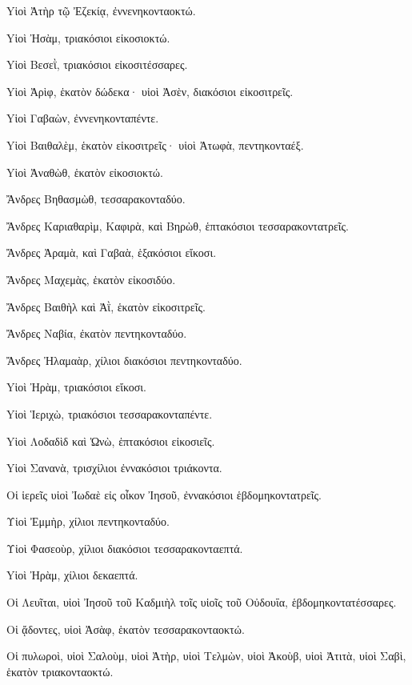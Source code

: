 {\par }{\PP {}Yἱοὶ Ἀτὴρ τῷ Ἐζεκίᾳ, ἐννενηκονταοκτώ.
\par }{\PP {}Yἱοὶ Ἠσὰμ, τριακόσιοι εἰκοσιοκτώ.
\par }{\PP {}Yἱοὶ Βεσεῒ, τριακόσιοι εἰκοσιτέσσαρες.
\par }{\PP {}Yἱοὶ Ἀρὶφ, ἑκατὸν δώδεκα· υἱοὶ Ἀσὲν, διακόσιοι εἰκοσιτρεῖς.
\par }{\PP {}Yἱοὶ Γαβαὼν, ἐννενηκονταπέντε.
\par }{\PP {}Yἱοὶ Βαιθαλὲμ, ἑκατὸν εἰκοσιτρεῖς· υἱοὶ Ἀτωφὰ, πεντηκονταέξ.
\par }{\PP {}Yἱοὶ Ἀναθὼθ, ἑκατὸν εἰκοσιοκτώ.
\par }{\PP {}Ἄνδρες Βηθασμὼθ, τεσσαρακονταδύο.
\par }{\PP {}Ἄνδρες Καριαθαρὶμ, Καφιρὰ, καὶ Βηρὼθ, ἑπτακόσιοι τεσσαρακοντατρεῖς.
\par }{\PP {}Ἄνδρες Ἀραμὰ, καὶ Γαβαὰ, ἑξακόσιοι εἴκοσι.
\par }{\PP {}Ἄνδρες Μαχεμὰς, ἑκατὸν εἰκοσιδύο.
\par }{\PP {}Ἄνδρες Βαιθὴλ καὶ Ἀῒ, ἑκατὸν εἰκοσιτρεῖς.
\par }{\PP {}Ἄνδρες Ναβία, ἐκατὸν πεντηκονταδύο.
\par }{\PP {}Ἄνδρες Ἠλαμαὰρ, χίλιοι διακόσιοι πεντηκονταδύο.
\par }{\PP {}Yἱοὶ Ἠρὰμ, τριακόσιοι εἴκοσι.
\par }{\PP {}Yἱοὶ Ἱεριχὼ, τριακόσιοι τεσσαρακονταπέντε.
\par }{\PP {}Yἱοὶ Λοδαδὶδ καὶ Ὠνὼ, ἑπτακόσιοι εἰκοσιεῖς.
\par }{\PP {}Yἱοὶ Σανανὰ, τρισχίλιοι ἐννακόσιοι τριάκοντα.
\par }{\PP {}Οἱ ἱερεῖς υἱοὶ Ἰωδαὲ εἰς οἶκον Ἰησοῦ, ἐννακόσιοι ἑβδομηκοντατρεῖς.
\par }{\PP {}Υἱοὶ Ἐμμὴρ, χίλιοι πεντηκονταδύο.
\par }{\PP {}Υἱοὶ Φασεοὺρ, χίλιοι διακόσιοι τεσσαρακονταεπτά.
\par }{\PP {}Yἱοὶ Ἠρὰμ, χίλιοι δεκαεπτά.
\par }{\PP {}Οἱ Λευῖται, υἱοὶ Ἰησοῦ τοῦ Καδμιὴλ τοῖς υἱοῖς τοῦ Οὐδουΐα, ἑβδομηκοντατέσσαρες.
\par }{\PP {}Οἱ ᾄδοντες, υἱοὶ Ἀσὰφ, ἑκατὸν τεσσαρακονταοκτώ.
\par }{\PP {}Οἱ πυλωροὶ, υἱοὶ Σαλοὺμ, υἱοὶ Ἀτὴρ, υἱοὶ Τελμὼν, υἱοὶ Ἀκοὺβ, υἱοὶ Ἀτιτὰ, υἱοὶ Σαβὶ, ἑκατὸν τριακονταοκτώ.
}
